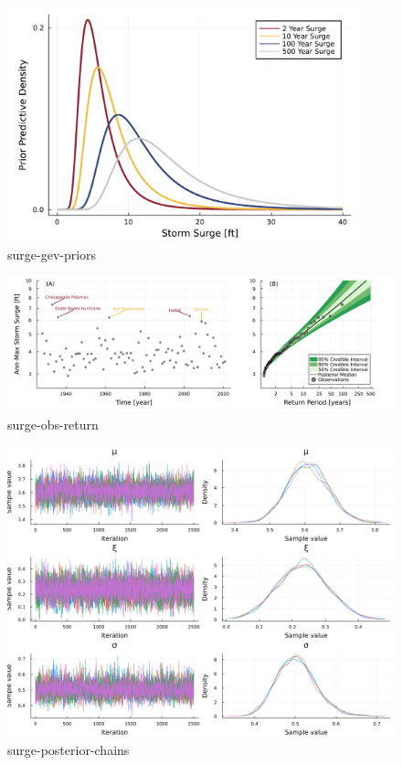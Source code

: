 \documentclass[12pt]{article}
\begin{document}
\begin{figure}
    \centering
    \includegraphics[width=4in]{surge-gev-priors}
    \caption{surge-gev-priors}\label{fig:surge-gev-priors}
\end{figure}

\begin{figure}
    \centering
    \includegraphics[width=\textwidth]{surge-obs-return}
    \caption{surge-obs-return}\label{fig:surge-obs-return}
\end{figure}

\begin{figure}
    \centering
    \includegraphics[width=\textwidth]{surge-posterior-chains}
    \caption{surge-posterior-chains}\label{fig:surge-posterior-chains}
\end{figure}
\end{document}
